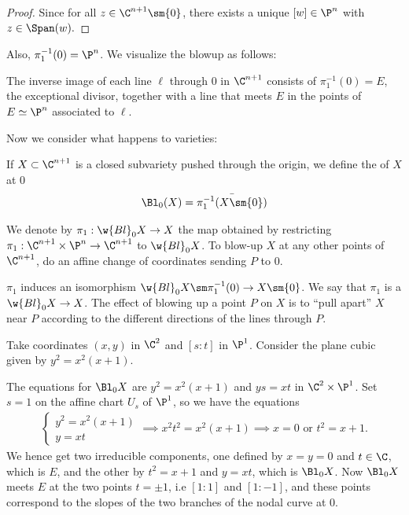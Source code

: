 \documentclass[11pt]{report}
\begin{document}
\begin{proof}
Since for all $z \in \C^{n+1} \sm \{0\}$, there exists a unique $[w]\in\P^n$ with $z \in \Span(w).$
\end{proof}

Also, $\pi_1^{-1}(0) = \P^n$. We visualize the blowup as follows:


The inverse image of each line $\ell$ through $0$ in $\C^{n+1}$ consists of $\pi_1^{-1}(0)= E$, the exceptional divisor, together with a line that meets $E$ in the points of $E \simeq \P^n$ associated to $\ell$.

Now we consider what happens to varieties:


\begin{defn}
If $X \subset \C^{n+1}$ is a closed subvariety pushed through the origin, we define the  of $X$ at $0$ 
\begin{align*}
\Bl_0(X) = \bar{\pi_1^{-1}(X \sm \{0\})}
\end{align*}


We denote by $\pi_1:\w{Bl}_0X \to X$ the map obtained by restricting $\pi_1:\C^{n+1}\times \P^n \to \C^{n+1}$ to $\w{Bl}_0 X$. To blow-up $X$ at any other points of $\C^{n+1}$, do an affine change of coordinates sending $P$ to $0$.
\end{defn}

$\pi_1$ induces an isomorphism $\w{Bl}_0X \sm \pi_1^{-1}(0) \to X \sm \{0\}$. We say that $\pi_1$ is a  $\w{Bl}_0 X \to X$. The effect of blowing up a point $P$ on $X$ is to ``pull apart'' $X$ near $P$ according to the different directions of the lines through $P$.

\begin{ex}
Take coordinates $(x,y)$ in $\C^2$ and $[s:t]$ in $\P^1$. Consider the plane cubic given by $y^2=x^2(x+1)$.


The equations for $\Bl_0 X$ are $y^2=x^2(x+1)$ and $ys=xt$ in $\C^2 \times \P^1$. Set $s=1$ on the affine chart $U_s$ of $\P^1$, so we have the equations
\begin{align*}
\begin{cases}
y^2 = x^2(x+1) \\ y = xt
\end{cases} \implies x^2t^2 = x^2(x+1) \implies x=0 \text{ or } t^2=x+1.
\end{align*}
We hence get two irreducible components, one defined by $x=y=0$ and $t \in \C$, which is $E$, and the other by $t^2=x+1$ and $y=xt$, which is $\Bl_0X$. Now $\Bl_0X$ meets $E$ at the two points $t = \pm 1$, i.e $[1:1]$ and $[1:-1]$, and these points correspond to the slopes of the two branches of the nodal curve at $0$.
\end{ex}
\end{document}
